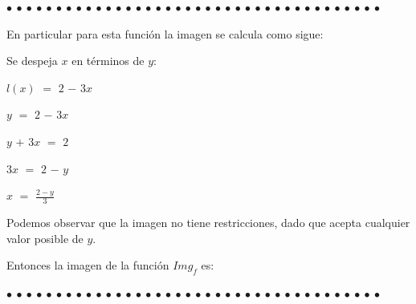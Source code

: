 \documentclass[12pt]{article}
\newenvironment{MyColorPar}[1]{%
    \leavevmode\color{#1}\ignorespaces%
}{%
}%
\begin{document}
\begin{MyColorPar}{Saffron} \bfseries{
 $\bullet$ $\bullet$ $\bullet$ $\bullet$ $\bullet$ $\bullet$ $\bullet$ $\bullet$ $\bullet$ $\bullet$ $\bullet$ $\bullet$ $\bullet$ $\bullet$ $\bullet$ $\bullet$ $\bullet$ $\bullet$ $\bullet$ $\bullet$ $\bullet$ $\bullet$ $\bullet$ $\bullet$ $\bullet$ $\bullet$ $\bullet$ $\bullet$ $\bullet$ $\bullet$ $\bullet$ $\bullet$ $\bullet$ $\bullet$ $\bullet$ $\bullet$ $\bullet$ $\bullet$  }
\end{MyColorPar}

\begin{MyColorPar}{carrotorange} \bfseries{
{} 
En particular para esta función la imagen se calcula como sigue: \vspace{0.5cm}

Se despeja $x$ en términos de $y$: \vspace{0.5cm}

\hspace{4cm}   $l(x)$ $=$ $2$ $-$ $3x$ \vspace{0.5cm}

\hspace{4cm}   $y$ $=$ $2$ $-$ $3x$ \vspace{0.5cm}

\hspace{4cm}   $y$ $+$ $3x$ $=$ $2$ \vspace{0.5cm}

\hspace{4cm}   $3x$ $=$ $2$ $-$ $y$ \vspace{0.5cm}

\hspace{4cm}   $x$ $=$ {\LARGE{${\frac{2 - y}{3}}$}} \vspace{0.5cm}

Podemos observar que la imagen no tiene restricciones, dado que acepta cualquier valor posible de $y$.\vspace{0.5cm}

Entonces la imagen de la función $Img_{f}$ es: \vspace{0.5cm}

\hspace{3cm} } \vspace{0.5cm}

\end{MyColorPar}

\begin{MyColorPar}{Saffron} \bfseries{
 $\bullet$ $\bullet$ $\bullet$ $\bullet$ $\bullet$ $\bullet$ $\bullet$ $\bullet$ $\bullet$ $\bullet$ $\bullet$ $\bullet$ $\bullet$ $\bullet$ $\bullet$ $\bullet$ $\bullet$ $\bullet$ $\bullet$ $\bullet$ $\bullet$ $\bullet$ $\bullet$ $\bullet$ $\bullet$ $\bullet$ $\bullet$ $\bullet$ $\bullet$ $\bullet$ $\bullet$ $\bullet$ $\bullet$ $\bullet$ $\bullet$ $\bullet$ $\bullet$ $\bullet$  }
\end{MyColorPar} \vspace{0.5cm}
\end{document}
